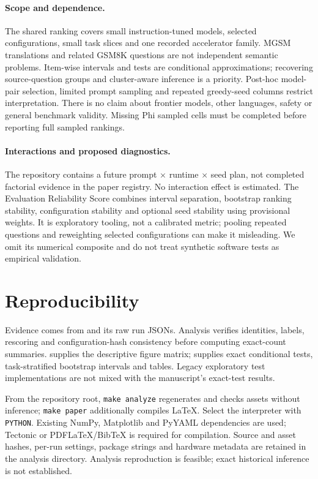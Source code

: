 \paragraph{Scope and dependence.}
The shared ranking covers small instruction-tuned models, selected configurations, small task slices and one recorded accelerator family. MGSM translations and related GSM8K questions are not independent semantic problems. Item-wise intervals and tests are conditional approximations; recovering source-question groups and cluster-aware inference is a priority. Post-hoc model-pair selection, limited prompt sampling and repeated greedy-seed columns restrict interpretation. There is no claim about frontier models, other languages, safety or general benchmark validity. Missing Phi sampled cells must be completed before reporting full sampled rankings.

\paragraph{Interactions and proposed diagnostics.}
The repository contains a future prompt $\times$ runtime $\times$ seed plan, not completed factorial evidence in the paper registry. No interaction effect is estimated. The Evaluation Reliability Score combines interval separation, bootstrap ranking stability, configuration stability and optional seed stability using provisional weights. It is exploratory tooling, not a calibrated metric; pooling repeated questions and reweighting selected configurations can make it misleading. We omit its numerical composite and do not treat synthetic software tests as empirical validation.

\section{Reproducibility}
\label{sec:repro}
Evidence comes from  and its raw run JSONs. Analysis verifies identities, labels, rescoring and configuration-hash consistency before computing exact-count summaries.  supplies the descriptive figure matrix;  supplies exact conditional tests, task-stratified bootstrap intervals and tables. Legacy exploratory test implementations are not mixed with the manuscript's exact-test results.

From the repository root, \texttt{make analyze} regenerates and checks assets without inference; \texttt{make paper} additionally compiles LaTeX. Select the interpreter with \texttt{PYTHON}. Existing NumPy, Matplotlib and PyYAML dependencies are used; Tectonic or PDFLaTeX/BibTeX is required for compilation. Source and asset hashes, per-run settings, package strings and hardware metadata are retained in the analysis directory. Analysis reproduction is feasible; exact historical inference is not established.

